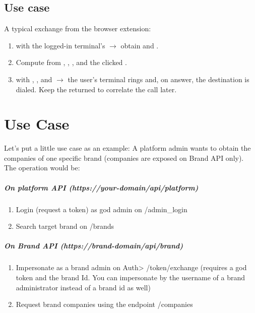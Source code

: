 \documentclass[letterpaper,10pt,english]{sphinxmanual}
\begin{document}
\section{Use case}
\label{api_rest/click2call:use-case}
A typical exchange from the browser extension:
\begin{enumerate}
\item {} 
 with the logged-in terminal's  \(\rightarrow\) obtain  and
.

\item {} 
Compute  from , , ,  and the
clicked .

\item {} 
 with , ,  and  \(\rightarrow\) the
user's terminal rings and, on answer, the destination is dialed. Keep the
returned  to correlate the call later.

\end{enumerate}


\chapter{Use Case}
\label{api_rest/use_case:use-case}\label{api_rest/use_case::doc}\label{api_rest/use_case:id1}
Let's put a little use case as an example: A platform admin wants to obtain the companies of one specific brand (companies are exposed on Brand API only). The operation would be:
\paragraph{On platform API (https://your-domain/api/platform)}
\begin{enumerate}
\item {} 
Login (request a token) as god admin on /admin\_login

\item {} 
Search target brand on /brands

\end{enumerate}
\paragraph{On Brand API (https://brand-domain/api/brand)}
\begin{enumerate}
\item {} 
Impersonate as a brand admin on Auth\textgreater{} /token/exchange (requires a god token and the brand Id. You can impersonate by the username of a brand administrator instead of a brand id as well)

\item {} 
Request brand companies using the endpoint /companies

\end{enumerate}
\end{document}
